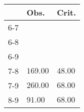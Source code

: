 \begin{table}[ht]
\centering
\begin{tabular}{rll}
  \hline
 & Obs. & Crit. \\ 
  \hline
6-7 &  &  \\ 
  6-8 &  &  \\ 
  6-9 &  &  \\ 
  7-8 & \(\mathbf{169.00}\) & \(\mathbf{48.00}\) \\ 
  7-9 & \(\mathbf{260.00}\) & \(\mathbf{68.00}\) \\ 
  8-9 & \(\mathbf{91.00}\) & \(\mathbf{68.00}\) \\ 
   \hline
\end{tabular}
\end{table}
